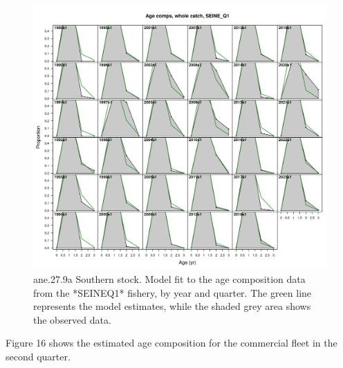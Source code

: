 \documentclass[
]{article}
\begin{document}
\begin{figure}[H]

{\centering \includegraphics[width=0.95\linewidth]{report/run/S1.0_4FLEETS_SelECO_RecIndex_Mnewfix/fig_age_fit_SeineQ1} 

}

\caption{ane.27.9a Southern stock. Model fit to the age composition data from the *SEINEQ1* fishery, by year and quarter. The green line represents the model estimates, while the shaded grey area shows the observed data.}\label{fig:unnamed-chunk-19}
\end{figure}

Figure 16 shows the estimated age composition for the commercial fleet
in the second quarter.
\end{document}
